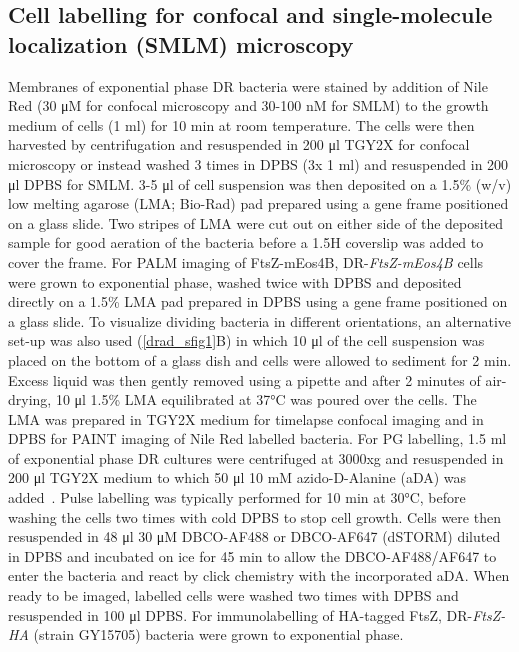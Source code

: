 \subsection{Cell labelling for confocal and single-molecule localization (SMLM) microscopy}

Membranes of exponential phase DR bacteria were stained by addition of Nile Red (30 μM for confocal microscopy and 30-100 nM for SMLM) to the growth medium of cells (1 ml) for 10 min at room temperature.
The cells were then harvested by centrifugation and resuspended in 200 μl TGY2X for confocal microscopy or instead washed 3 times in DPBS (3x 1 ml) and resuspended in 200 μl DPBS for SMLM.
3-5 μl of cell suspension was then deposited on a 1.5\% (w/v) low melting agarose (LMA; Bio-Rad) pad prepared using a gene frame positioned on a glass slide.
Two stripes of LMA were cut out on either side of the deposited sample for good aeration of the bacteria before a 1.5H coverslip was added to cover the frame.
For PALM imaging of FtsZ-mEos4B, DR-\textit{FtsZ-mEos4B} cells were grown to exponential phase, washed twice with DPBS and deposited directly on a 1.5\% LMA pad prepared in DPBS using a gene frame positioned on a glass slide.
To visualize dividing bacteria in different orientations, an alternative set-up was also used (\autoref{drad_sfig1}B) in which 10 μl of the cell suspension was placed on the bottom of a glass dish and cells were allowed to sediment for 2 min.
Excess liquid was then gently removed using a pipette and after 2 minutes of air-drying, 10 μl 1.5\% LMA equilibrated at 37°C was poured over the cells.
The LMA was prepared in TGY2X medium for timelapse confocal imaging and in DPBS for PAINT imaging of Nile Red labelled bacteria.
For PG labelling, 1.5 ml of exponential phase DR cultures were centrifuged at 3000xg and resuspended in 200 μl TGY2X medium to which 50 μl 10 mM azido-D-Alanine (aDA) was added~\cite{trouveNanoscaleDynamicsPeptidoglycan2021,trouveMetabolicBiorthogonalLabeling2021}.
Pulse labelling was typically performed for 10 min at 30°C, before washing the cells two times with cold DPBS to stop cell growth.
Cells were then resuspended in 48 μl 30 μM DBCO-AF488 or DBCO-AF647 (dSTORM) diluted in DPBS and incubated on ice for 45 min to allow the DBCO-AF488/AF647 to enter the bacteria and react by click chemistry with the incorporated aDA.
When ready to be imaged, labelled cells were washed two times with DPBS and resuspended in 100 μl DPBS.
For immunolabelling of HA-tagged FtsZ, DR-\textit{FtsZ-HA} (strain GY15705) bacteria were grown to exponential phase.
